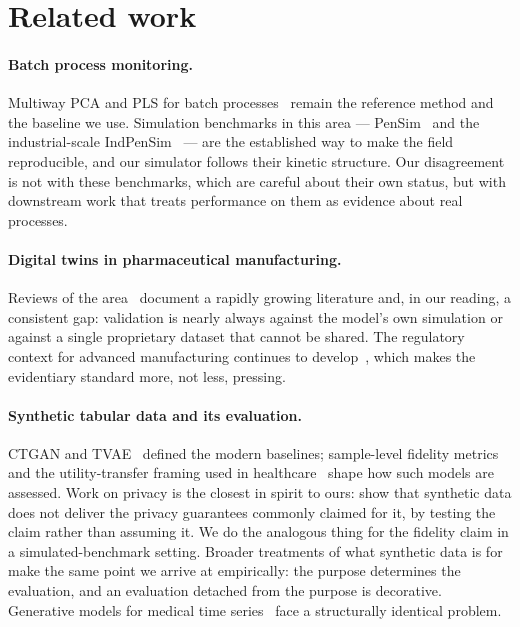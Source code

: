 \documentclass[11pt]{article}
\begin{document}
\section{Related work}
\label{sec:related}

\paragraph{Batch process monitoring.} Multiway PCA and PLS for batch
processes~\citep{nomikos1994monitoring,nomikos1995multivariate} remain the
reference method and the baseline we use. Simulation benchmarks in this area ---
PenSim~\citep{birol2002modular} and the industrial-scale
IndPenSim~\citep{goldrick2015development,goldrick2019modern} --- are the
established way to make the field reproducible, and our simulator follows their
kinetic structure. Our disagreement is not with these benchmarks, which are
careful about their own status, but with downstream work that treats performance
on them as evidence about real processes.

\paragraph{Digital twins in pharmaceutical manufacturing.} Reviews of the
area~\citep{chen2020digital} document a rapidly growing literature and, in our
reading, a consistent gap: validation is nearly always against the model's own
simulation or against a single proprietary dataset that cannot be shared. The
regulatory context for advanced manufacturing continues to
develop~\citep{ich2022q13}, which makes the evidentiary standard more, not less,
pressing.

\paragraph{Synthetic tabular data and its evaluation.} CTGAN and
TVAE~\citep{xu2019modeling} defined the modern baselines; sample-level fidelity
metrics~\citep{alaa2022faithful} and the utility-transfer framing used in
healthcare~\citep{rankin2020reliability} shape how such models are assessed.
Work on privacy is the closest in spirit to ours: \citet{stadler2022synthetic}
show that synthetic data does not deliver the privacy guarantees commonly
claimed for it, by testing the claim rather than assuming it. We do the analogous
thing for the fidelity claim in a simulated-benchmark setting. Broader treatments
of what synthetic data is for~\citep{jordon2022synthetic} make the same point we
arrive at empirically: the purpose determines the evaluation, and an evaluation
detached from the purpose is decorative. Generative models for medical time
series~\citep{esteban2017realvalued} face a structurally identical problem.
\end{document}
